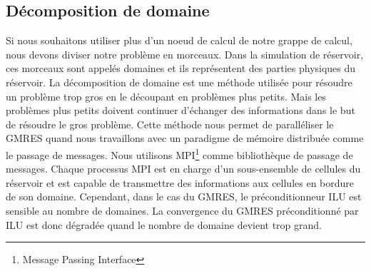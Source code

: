 \subsection{Décomposition de domaine}
Si nous souhaitons utiliser plus d'un noeud de calcul de notre grappe de calcul, nous devons diviser notre problème en morceaux.
%
Dans la simulation de réservoir, ces morceaux sont appelés domaines et ils représentent des parties physiques du réservoir.
%
La décomposition de domaine est une méthode utilisée pour résoudre un problème trop gros en le découpant en problèmes plus petits.
%
Mais les problèmes plus petits doivent continuer d'échanger des informations dans le but de résoudre le gros problème.
%
Cette méthode nous permet de paralléliser le GMRES quand nous travaillons avec un paradigme de mémoire distribuée comme le passage de messages.
%
Nous utilisons MPI\footnote{Message Passing Interface} comme bibliothèque de passage de messages.
%
Chaque processus MPI est en charge d'un sous-ensemble de cellules du réservoir et est capable de transmettre des informations aux cellules en bordure de son domaine.
%
Cependant, dans le cas du GMRES, le préconditionneur ILU est sensible au nombre de domaines.
%
La convergence du GMRES préconditionné par ILU est donc dégradée quand le nombre de domaine devient trop grand.
